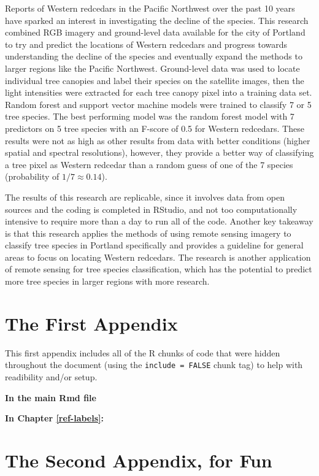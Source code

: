 \documentclass[12pt,twoside]{reedthesis}
\begin{document}
Reports of Western redcedars in the Pacific Northwest over the past 10 years have sparked an interest in investigating the decline of the species. This research combined RGB imagery and ground-level data available for the city of Portland to try and predict the locations of Western redcedars and progress towards understanding the decline of the species and eventually expand the methods to larger regions like the Pacific Northwest. Ground-level data was used to locate individual tree canopies and label their species on the satellite images, then the light intensities were extracted for each tree canopy pixel into a training data set. Random forest and support vector machine models were trained to classify 7 or 5 tree species. The best performing model was the random forest model with 7 predictors on 5 tree species with an F-score of 0.5 for Western redcedars. These results were not as high as other results from data with better conditions (higher spatial and spectral resolutions), however, they provide a better way of classifying a tree pixel as Western redcedar than a random guess of one of the 7 species (probability of \(1/7 \approx 0.14\)).

The results of this research are replicable, since it involves data from open sources and the coding is completed in RStudio, and not too computationally intensive to require more than a day to run all of the code. Another key takeaway is that this research applies the methods of using remote sensing imagery to classify tree species in Portland specifically and provides a guideline for general areas to focus on locating Western redcedars. The research is another application of remote sensing for tree species classification, which has the potential to predict more tree species in larger regions with more research.

\appendix

\hypertarget{the-first-appendix}{%
\chapter{The First Appendix}\label{the-first-appendix}}

This first appendix includes all of the R chunks of code that were hidden throughout the document (using the \texttt{include\ =\ FALSE} chunk tag) to help with readibility and/or setup.

\textbf{In the main Rmd file}

\textbf{In Chapter \ref{ref-labels}:}

\hypertarget{the-second-appendix-for-fun}{%
\chapter{The Second Appendix, for Fun}\label{the-second-appendix-for-fun}}
\end{document}
